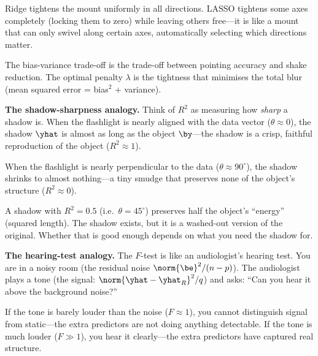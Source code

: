 Ridge tightens the mount uniformly in all directions.
LASSO tightens some axes completely (locking them to zero) while
leaving others free---it is like a mount that can only swivel along
certain axes, automatically selecting which directions matter.

The bias-variance trade-off is the trade-off between pointing accuracy
and shake reduction.
The optimal penalty $\lambda$ is the tightness that minimises the
total blur (mean squared error = bias$^2$ + variance).



\medskip
\noindent\textbf{The shadow-sharpness analogy.}
Think of $R^2$ as measuring how \emph{sharp} a shadow is.
When the flashlight is nearly aligned with the data vector
($\theta \approx 0$), the shadow $\yhat$ is almost as long as the
object $\by$---the shadow is a crisp, faithful reproduction of the
object ($R^2 \approx 1$).

When the flashlight is nearly perpendicular to the data
($\theta \approx 90^\circ$), the shadow shrinks to almost nothing---a
tiny smudge that preserves none of the object's structure ($R^2 \approx 0$).

A shadow with $R^2 = 0.5$ (i.e.\ $\theta = 45^\circ$) preserves half
the object's ``energy'' (squared length).
The shadow exists, but it is a washed-out version of the original.
Whether that is good enough depends on what you need the shadow for.



\medskip
\noindent\textbf{The hearing-test analogy.}
The $F$-test is like an audiologist's hearing test.
You are in a noisy room (the residual noise $\norm{\be}^2/(n-p)$).
The audiologist plays a tone (the signal: $\norm{\yhat - \yhat_R}^2/q$)
and asks: ``Can you hear it above the background noise?''

If the tone is barely louder than the noise ($F \approx 1$), you cannot
distinguish signal from static---the extra predictors are not doing
anything detectable.
If the tone is much louder ($F \gg 1$), you hear it clearly---the extra
predictors have captured real structure.

